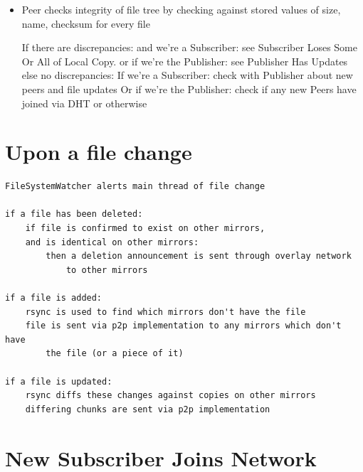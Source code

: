 \documentclass[12pt,a4paper,]{adreport}
\begin{document}
\begin{itemize}
\item
  Peer checks integrity of file tree by checking against stored values
  of size, name, checksum for every file

  If there are discrepancies: and we're a Subscriber: see Subscriber
  Loses Some Or All of Local Copy. or if we're the Publisher: see
  Publisher Has Updates else no discrepancies: If we're a Subscriber:
  check with Publisher about new peers and file updates Or if we're the
  Publisher: check if any new Peers have joined via DHT or otherwise
\end{itemize}

\section{Upon a file change}\label{upon-a-file-change}

\begin{verbatim}
FileSystemWatcher alerts main thread of file change

if a file has been deleted:
    if file is confirmed to exist on other mirrors,
    and is identical on other mirrors:
        then a deletion announcement is sent through overlay network
        	to other mirrors

if a file is added:
    rsync is used to find which mirrors don't have the file
    file is sent via p2p implementation to any mirrors which don't have
    	the file (or a piece of it)
    
if a file is updated:
    rsync diffs these changes against copies on other mirrors
    differing chunks are sent via p2p implementation
\end{verbatim}



\section{New Subscriber Joins
Network}\label{new-subscriber-joins-network}
\end{document}
